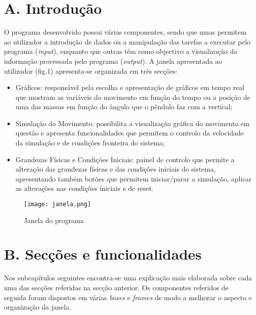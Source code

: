 \documentclass[a4paper]{article}
\begin{document}
\section{\bf A. Introdução}
\par O programa desenvolvido possui várias componentes, sendo que umas permitem ao utilizador a introdução de dados ou a manipulação das tarefas a executar pelo programa (\textit{input}), enquanto que outras têm como objectivo a visualização da informação processada pelo programa (\textit{output}). A janela apresentada ao utilizador (fig.1) apresenta-se organizada em três secções: 
\begin{itemize}
\item Gráficos: responsável pela escolha e apresentação de gráficos em tempo real que mostram as variáveis do movimento em função do tempo ou a posição de uma das massas em função do ângulo que o pêndulo faz com a vertical;
\item Simulação do Movimento: possibilita a visualização gráfica do movimento em questão e apresenta funcionalidades que permitem o controlo da velocidade da simulação e de condições fronteira do sistema;
\item Grandezas Físicas e Condições Iniciais: painel de controlo que permite a alteração das grandezas físicas e das condições iniciais do sistema, apresentando também botões que permitem iniciar/parar a simulação, aplicar as alterações nas condições iniciais e de reset.
\end{itemize}
\vspace{2mm}

\begin{figure}[H]
\caption{Janela do programa}
\begin{center}
\texttt{[image: janela.png]}
\end{center}
\end{figure}
\clearpage 
\section{\bf B. Secções e funcionalidades}
\par Nos subcapítulos seguintes encontra-se uma explicação mais elaborada sobre cada uma das secções referidas na secção anterior. Os componentes referidos de seguida foram dispostos em várias \textit{boxes} e \textit{frames} de modo a melhorar o aspecto e organização da janela.
\end{document}
